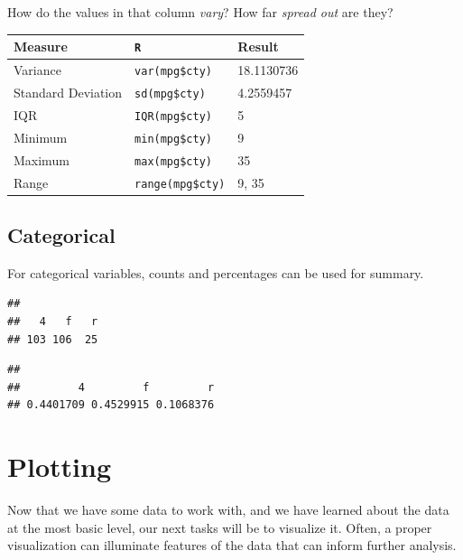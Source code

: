 \documentclass[]{book}
\newenvironment{Shaded}{\begin{snugshade}}{\end{snugshade}}
\newcommand{\KeywordTok}[1]{\textcolor[rgb]{0.13,0.29,0.53}{\textbf{#1}}}
\newcommand{\StringTok}[1]{\textcolor[rgb]{0.31,0.60,0.02}{#1}}
\newcommand{\OperatorTok}[1]{\textcolor[rgb]{0.81,0.36,0.00}{\textbf{#1}}}
\newcommand{\NormalTok}[1]{#1}
\theoremstyle{definition}
\theoremstyle{definition}
\theoremstyle{definition}
\theoremstyle{remark}
\begin{document}
How do the values in that column \emph{vary}? How far \emph{spread out}
are they?

\begin{longtable}[]{@{}lll@{}}
\toprule
Measure & \texttt{R} & Result\tabularnewline
\midrule
\endhead
Variance & \texttt{var(mpg\$cty)} & 18.1130736\tabularnewline
Standard Deviation & \texttt{sd(mpg\$cty)} & 4.2559457\tabularnewline
IQR & \texttt{IQR(mpg\$cty)} & 5\tabularnewline
Minimum & \texttt{min(mpg\$cty)} & 9\tabularnewline
Maximum & \texttt{max(mpg\$cty)} & 35\tabularnewline
Range & \texttt{range(mpg\$cty)} & 9, 35\tabularnewline
\bottomrule
\end{longtable}

\subsection*{Categorical}\label{categorical}

For categorical variables, counts and percentages can be used for
summary.

\begin{Shaded}
\end{Shaded}

\begin{verbatim}
## 
##   4   f   r 
## 103 106  25
\end{verbatim}

\begin{Shaded}
\end{Shaded}

\begin{verbatim}
## 
##         4         f         r 
## 0.4401709 0.4529915 0.1068376
\end{verbatim}

\section{Plotting}\label{plotting}

Now that we have some data to work with, and we have learned about the
data at the most basic level, our next tasks will be to visualize it.
Often, a proper visualization can illuminate features of the data that
can inform further analysis.
\end{document}
